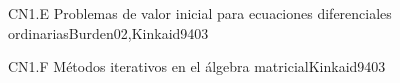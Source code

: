\begin{syllabus}
\begin{unit}{CN1.E Problemas de valor inicial para ecuaciones diferenciales ordinarias}{}{Burden02,Kinkaid94}{0}{3}
   \begin{learningoutcomes}
      \item \CNONEObjONE
      \item \CNONEObjTWO
      \item \CNONEObjTHREE
      \item \CNONEObjFOUR
   \end{learningoutcomes}
\end{unit}

\begin{unit}{CN1.F Métodos iterativos en el álgebra matricial}{}{Kinkaid94}{0}{3}
\begin{topics}
      \item \CNONETopicLinear
      \item \CNONETopicFinite
   \end{topics}

   \begin{learningoutcomes}
      \item \CNONEObjONE
      \item \CNONEObjTWO
      \item \CNONEObjTHREE
      \item \CNONEObjFOUR
   \end{learningoutcomes}
\end{unit}



\begin{coursebibliography}
\end{coursebibliography}

\end{syllabus}

